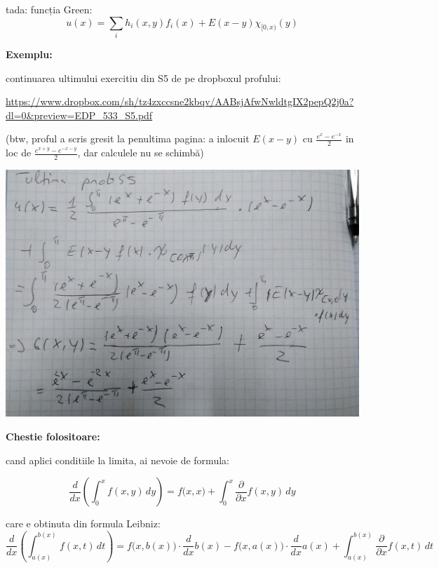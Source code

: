 \documentclass{article}
\begin{document}
      tada: funcția Green:
      \[
      u(x) = \sum_i h_i(x,y) f_i(x) +E(x-y) \chi_{[0, x)}(y)
      \]


      \textbf{Exemplu:}
      
      continuarea ultimului exercitiu din S5 de pe dropboxul profului:

      \url{https://www.dropbox.com/sh/tz4zxccsne2kbqv/AABsjAfwNwldtgIX2pepQ2j0a?dl=0&preview=EDP_533_S5.pdf}

      (btw, proful a scris gresit la penultima pagina: a inlocuit $E(x-y)$ cu $\displaystyle\frac{e^x-e^{-x}}{2}$ in loc de
      $\displaystyle\frac{e^{x+y}-e^{-x-y}}{2}$, dar calculele nu se schimbă)

      \medskip
      
      \includegraphics[width=\textwidth]{t.jpg}

      \medskip
      
      \textbf{Chestie folositoare:}

      cand aplici conditiile la limita, ai nevoie de formula:
      
      \[ \frac{d}{dx} \left (\int_{0}^{x} f(x,y)\,dy \right) = f\big(x,x) + \int_{0}^{x}\frac{\partial}{\partial x} f(x,y) \,dy\]

      \medskip
      
      care e obtinuta din formula Leibniz:
      \[ \frac{d}{dx} \left (\int_{a(x)}^{b(x)}f(x,t)\,dt \right) = f\big(x,b(x)\big)\cdot \frac{d}{dx} b(x) - f\big(x,a(x)\big)\cdot \frac{d}{dx} a(x) + \int_{a(x)}^{b(x)}\frac{\partial}{\partial x} f(x,t) \,dt\]

      
   
\end{document}
